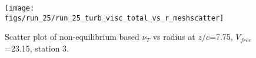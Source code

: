 \begin{figure}[H]
\centering
\texttt{[image: figs/run\_25/run\_25\_turb\_visc\_total\_vs\_r\_meshscatter]}
\caption{Scatter plot of non-equilibrium based $\nu_T$ vs radius at $z/c$=7.75, $V_{free}$=23.15, station 3.}
\label{fig:run_25_turb_visc_total_vs_r_meshscatter}
\end{figure}


